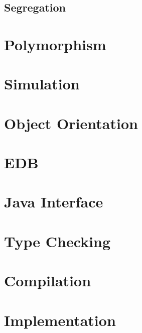 \documentclass[5p,times]{elsarticle}
\begin{document}
\subsection{Segregation}

\label{sec:segregation}



\section{Polymorphism}

\label{sec:polymorphism}


\section{Simulation}


\section{Object Orientation}


\section{EDB}

\section{Java Interface}

\section{Type Checking}

\section{Compilation}

\section{Implementation}



\clearpage

\appendix

\renewcommand*{\thesection}{\Alph{section}}
\end{document}
